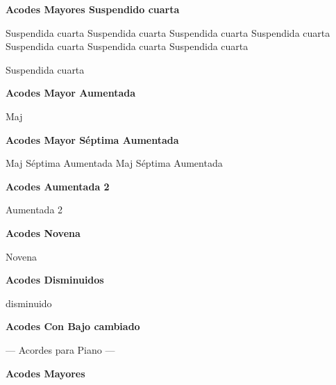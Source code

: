 \textbf{Acodes Mayores Suspendido cuarta}

\small
{} Suspendida cuarta
 Suspendida cuarta
 Suspendida cuarta
 Suspendida cuarta
 Suspendida cuarta
 Suspendida cuarta
 Suspendida cuarta

 Suspendida cuarta
\normalsize

\vskip 20pt
\textbf{Acodes Mayor Aumentada}
\vskip 25pt

\small
{} Maj
\normalsize

\vskip 20pt
\textbf{Acodes Mayor S\'eptima Aumentada}
\vskip 25pt

\small
{} Maj S\'eptima Aumentada
 Maj S\'eptima Aumentada
\normalsize

\vskip 20pt
\textbf{Acodes Aumentada 2}
\vskip 25pt

\small
{} Aumentada 2
\normalsize

\vskip 20pt
\textbf{Acodes Novena}
\vskip 25pt

\small
{} Novena
\normalsize

\vskip 20pt
\textbf{Acodes Disminuidos}
\vskip 25pt

\small
{} disminuido
\normalsize


\vskip 20pt
\textbf{Acodes Con Bajo cambiado}

\small
{}
\vskip 20pt
\vskip 20pt
\normalsize

\clearpage
\fi

\ifpiano
{}
{\parindent 8pt
        {\myTitleFont --- Acordes para Piano ---}}\par
\vskip 20pt
\textbf{Acodes Mayores}
\vskip 25pt

\small
{} \qquad\qquad {} \qquad\qquad {} \qquad\qquad {} \hfill \break
\vskip 25pt
 \qquad\qquad  {} \qquad\qquad {}
\vskip 25pt
 \qquad\qquad {} \qquad\qquad {} \qquad\qquad {} \hfill \break
\vskip 25pt
 \qquad\qquad {}
\normalsize

